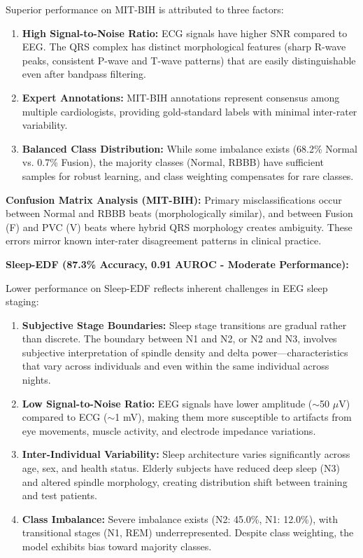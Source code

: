 \documentclass[conference]{IEEEtran}
\begin{document}
Superior performance on MIT-BIH is attributed to three factors:
\begin{enumerate}
\item \textbf{High Signal-to-Noise Ratio:} ECG signals have higher SNR compared to EEG. The QRS complex has distinct morphological features (sharp R-wave peaks, consistent P-wave and T-wave patterns) that are easily distinguishable even after bandpass filtering.
\item \textbf{Expert Annotations:} MIT-BIH annotations represent consensus among multiple cardiologists, providing gold-standard labels with minimal inter-rater variability.
\item \textbf{Balanced Class Distribution:} While some imbalance exists (68.2\% Normal vs. 0.7\% Fusion), the majority classes (Normal, RBBB) have sufficient samples for robust learning, and class weighting compensates for rare classes.
\end{enumerate}

\textbf{Confusion Matrix Analysis (MIT-BIH):} Primary misclassifications occur between Normal and RBBB beats (morphologically similar), and between Fusion (F) and PVC (V) beats where hybrid QRS morphology creates ambiguity. These errors mirror known inter-rater disagreement patterns in clinical practice.

\textbf{Sleep-EDF (87.3\% Accuracy, 0.91 AUROC - Moderate Performance):}

Lower performance on Sleep-EDF reflects inherent challenges in EEG sleep staging:
\begin{enumerate}
\item \textbf{Subjective Stage Boundaries:} Sleep stage transitions are gradual rather than discrete. The boundary between N1 and N2, or N2 and N3, involves subjective interpretation of spindle density and delta power—characteristics that vary across individuals and even within the same individual across nights.
\item \textbf{Low Signal-to-Noise Ratio:} EEG signals have lower amplitude ($\sim$50 $\mu$V) compared to ECG ($\sim$1 mV), making them more susceptible to artifacts from eye movements, muscle activity, and electrode impedance variations.
\item \textbf{Inter-Individual Variability:} Sleep architecture varies significantly across age, sex, and health status. Elderly subjects have reduced deep sleep (N3) and altered spindle morphology, creating distribution shift between training and test patients.
\item \textbf{Class Imbalance:} Severe imbalance exists (N2: 45.0\%, N1: 12.0\%), with transitional stages (N1, REM) underrepresented. Despite class weighting, the model exhibits bias toward majority classes.
\end{enumerate}
\end{document}
